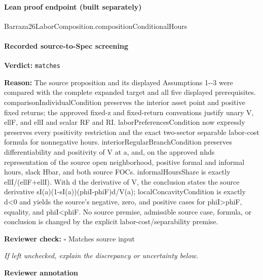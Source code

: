 \documentclass[10pt]{article}
\newcommand{\reviewerbox}{%
  \par\noindent\fbox{\parbox{0.96\linewidth}{\rule{0pt}{0.38in}}}\par
}
\newcommand{\reviewmatch}[1]{%
  \par\noindent\textbf{Reviewer check:} $\square$\; #1\par
  \noindent\emph{If left unchecked, explain the discrepancy or uncertainty below.}\par
}
\begin{document}
\paragraph{Lean proof endpoint (built separately)}\begin{ReviewVerbatim}
Barraza26LaborComposition.compositionConditionalHours
\end{ReviewVerbatim}

\paragraph{Recorded source-to-Spec screening}
\textbf{Verdict:} \texttt{matches}
\\
{\raggedright
\textbf{Reason:} The source proposition and its displayed Assumptions 1-\allowbreak{}-\allowbreak{}3 were compared with the complete expanded target and all five displayed prerequisites.\allowbreak{} comparisonIndividualCondition preserves the interior asset point and positive fixed returns;\allowbreak{} the approved fixed-\allowbreak{}z and fixed-\allowbreak{}return conventions justify unary V, ellF, and ellI and scalar RF and RI.\allowbreak{} laborPreferencesCondition now expressly preserves every positivity restriction and the exact two-\allowbreak{}sector separable labor-\allowbreak{}cost formula for nonnegative hours.\allowbreak{} interiorRegularBranchCondition preserves differentiability and positivity of V at a, and, on the approved nhds representation of the source open neighborhood, positive formal and informal hours, slack Hbar, and both source FOCs.\allowbreak{} informalHoursShare is exactly ellI/\allowbreak{}(ellF+ellI).\allowbreak{} With d the derivative of V, the conclusion states the source derivative sI(a)(1-\allowbreak{}sI(a))(phiI-\allowbreak{}phiF)d/\allowbreak{}V(a);\allowbreak{} localConcavityCondition is exactly d<0 and yields the source's negative, zero, and positive cases for phiI>phiF, equality, and phiI<phiF.\allowbreak{} No source premise, admissible source case, formula, or conclusion is changed by the explicit labor-\allowbreak{}cost/\allowbreak{}separability premise.\allowbreak{}
\par}
\reviewmatch{Matches source input}
\noindent\textbf{Reviewer annotation}\par
\reviewerbox
\end{document}
